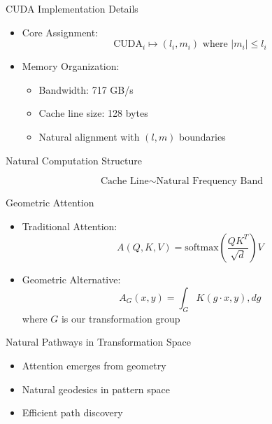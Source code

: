 \documentclass{beamer}
\begin{document}
\begin{frame}{CUDA Implementation Details}
\begin{itemize}
\item Core Assignment:
\begin{equation*}
\text{CUDA}_i \mapsto (l_i, m_i) \text{ where } |m_i| \leq l_i
\end{equation*}
\item Memory Organization:
\begin{itemize}
\item Bandwidth: 717 GB/s
\item Cache line size: 128 bytes
\item Natural alignment with $(l,m)$ boundaries
\end{itemize}
\end{itemize}
\end{frame}
\begin{frame}{Natural Computation Structure}
\begin{center}
\end{center}
\begin{equation*}
\text{Cache Line} \sim \text{Natural Frequency Band}
\end{equation*}
\end{frame}
\begin{frame}{Geometric Attention}
\begin{itemize}
\item Traditional Attention:
\begin{equation*}
A(Q,K,V) = \text{softmax}\left(\frac{QK^T}{\sqrt{d}}\right)V
\end{equation*}
\pause
\item Geometric Alternative:
\begin{equation*}
A_G(x,y) = \int_G K(g \cdot x, y) , dg
\end{equation*}
where $G$ is our transformation group
\end{itemize}
\end{frame}
\begin{frame}{Natural Pathways in Transformation Space}
\begin{center}
\end{center}
\begin{itemize}
\item Attention emerges from geometry
\item Natural geodesics in pattern space
\item Efficient path discovery
\end{itemize}
\end{frame}
\end{document}
